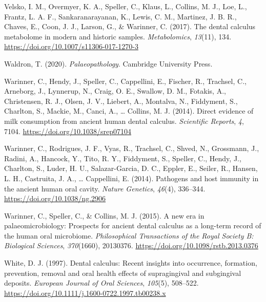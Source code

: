 \documentclass[
  letterpaper,
]{book}
\newlength{\cslhangindent}
\newlength{\cslentryspacingunit} %
\newenvironment{CSLReferences}[2] %
 {%
  \setlength{\parindent}{0pt}
  \ifodd #1
  \let\oldpar\par
  \def\par{\hangindent=\cslhangindent\oldpar}
  \fi
  \setlength{\parskip}{#2\cslentryspacingunit}
 }%
 {}
\begin{document}
\begin{CSLReferences}{1}{0}
\leavevmode{}%
Velsko, I. M., Overmyer, K. A., Speller, C., Klaus, L., Collins, M. J.,
Loe, L., Frantz, L. A. F., Sankaranarayanan, K., Lewis, C. M., Martinez,
J. B. R., Chaves, E., Coon, J. J., Larson, G., \& Warinner, C. (2017).
The dental calculus metabolome in modern and historic samples.
\emph{Metabolomics}, \emph{13}(11), 134.
\url{https://doi.org/10.1007/s11306-017-1270-3}

\leavevmode{}%
Waldron, T. (2020). \emph{Palaeopathology}. {Cambridge University
Press}.

\leavevmode{}%
Warinner, C., Hendy, J., Speller, C., Cappellini, E., Fischer, R.,
Trachsel, C., Arneborg, J., Lynnerup, N., Craig, O. E., Swallow, D. M.,
Fotakis, A., Christensen, R. J., Olsen, J. V., Liebert, A., Montalva,
N., Fiddyment, S., Charlton, S., Mackie, M., Canci, A., \ldots{}
Collins, M. J. (2014). Direct evidence of milk consumption from ancient
human dental calculus. \emph{Scientific Reports}, \emph{4}, 7104.
\url{https://doi.org/10.1038/srep07104}

\leavevmode{}%
Warinner, C., Rodrigues, J. F., Vyas, R., Trachsel, C., Shved, N.,
Grossmann, J., Radini, A., Hancock, Y., Tito, R. Y., Fiddyment, S.,
Speller, C., Hendy, J., Charlton, S., Luder, H. U., Salazar-Garcia, D.
C., Eppler, E., Seiler, R., Hansen, L. H., Castruita, J. A., \ldots{}
Cappellini, E. (2014). Pathogens and host immunity in the ancient human
oral cavity. \emph{Nature Genetics}, \emph{46}(4), 336--344.
\url{https://doi.org/10.1038/ng.2906}

\leavevmode{}%
Warinner, C., Speller, C., \& Collins, M. J. (2015). A new era in
palaeomicrobiology: Prospects for ancient dental calculus as a long-term
record of the human oral microbiome. \emph{Philosophical Transactions of
the Royal Society B: Biological Sciences}, \emph{370}(1660), 20130376.
\url{https://doi.org/10.1098/rstb.2013.0376}

\leavevmode{}%
White, D. J. (1997). Dental calculus: Recent insights into occurrence,
formation, prevention, removal and oral health effects of supragingival
and subgingival deposits. \emph{European Journal of Oral Sciences},
\emph{105}(5), 508--522.
\url{https://doi.org/10.1111/j.1600-0722.1997.tb00238.x}


\end{CSLReferences}
\end{document}
